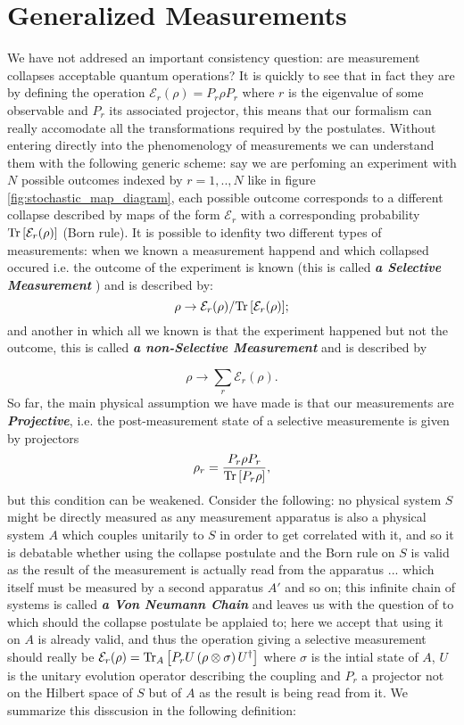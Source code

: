 \section{Generalized Measurements}
We have not addresed an important consistency question: are measurement collapses acceptable quantum operations? It is quickly to see that
in fact they are by defining the operation $\mathcal{E}_{r}(\rho)=P_{r}\rho P_{r}$ where $r$ is the eigenvalue of some observable and $P_{r}$ its
associated projector, this means that our formalism can really accomodate all the transformations required by the postulates. Without entering
directly into the phenomenology of measurements we can understand them with the following generic scheme: say we are perfoming an experiment
with $N$ possible outcomes indexed by ${r=1,..,N}$ like in figure \ref{fig:stochastic_map_diagram}, each possible outcome corresponds to a
different collapse described by maps of the form $\mathcal{E}_{r}$ with a corresponding probability $\mathrm{Tr}\left[\mathcal{E}_{r}(\rho)\right]$ (Born rule).
It is possible to idenfity two different types of measurements: when we known a measurement happend and which collapsed occured i.e.
the outcome of the experiment is known (this is  called  \textit{\textbf{a Selective Measurement}} \cite{diosi_short_2011})
and is described by:
\begin{equation}
\rho \to \mathcal{E}_{r}(\rho)/{\mathrm{Tr}\left[\mathcal{E}_{r}(\rho)\right]};
\end{equation}
and another in which all we known is that the experiment happened but not the outcome, this is called \textit{\textbf{a non-Selective Measurement}}
\cite{diosi_short_2011} and is described by

\begin{equation}
\rho \to \sum_{r}\mathcal{E}_{r}(\rho).
\end{equation}
So far, the main physical assumption we have made is that our measurements are \textbf{\textit{Projective}}, i.e. the post-measurement state
of a selective measuremente is given by projectors
\begin{equation}
\rho_{r} = \frac{P_{r}\rho P_{r}}{\mathrm{Tr}\left[P_{r}\rho\right]},
\end{equation}
but this condition can be weakened. Consider the following: no physical system $S$ might be directly measured as any measurement apparatus is
also a physical system $A$ which couples unitarily to $S$ in order to get correlated with it, and so it is debatable whether using the collapse postulate and the Born rule on $S$ is valid as the
result of the measurement is actually read from the apparatus ... which itself must be measured by a second apparatus $A'$ and so on; this
infinite chain of systems is called \textbf{\textit{a Von Neumann Chain}} and leaves us with the question of to which should the
collapse postulate be applaied to; here we accept that using it on $A$ is already valid, and thus the operation giving a selective measurement
should really be $\mathcal{E}_{r}(\rho) = \mathrm{Tr}_{A}\left[P_{r} U\left(\rho\otimes\sigma \right)U^{\dagger}\right]$ where $\sigma$ is the intial state of $A$,
$U$ is the unitary evolution operator describing the coupling and $P_{r}$ a projector not on the Hilbert space of $S$ but of $A$ as the result is being read from it. We summarize this disscusion in the following definition:


